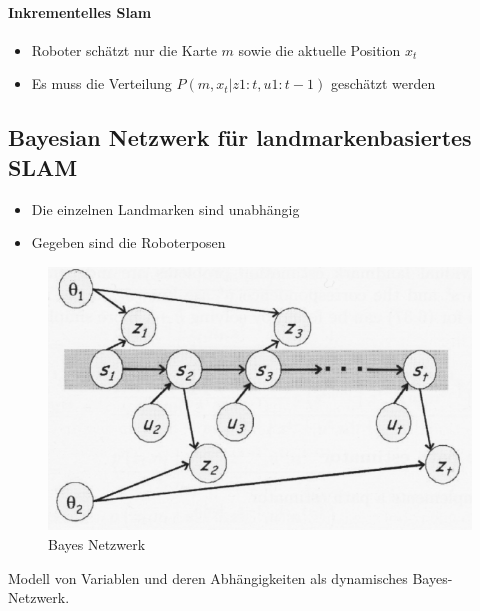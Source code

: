 \paragraph{Inkrementelles Slam}
\begin{itemize}
	\item Roboter schätzt nur die Karte $m$ sowie die aktuelle Position $x_t$
	\item Es muss die Verteilung $P(m, x_t | z1:t, u1:t-1)$ geschätzt werden
\end{itemize}
\subsection{Bayesian Netzwerk für landmarkenbasiertes SLAM}
\begin{itemize}
	\item Die einzelnen Landmarken sind unabhängig
	\item Gegeben sind die Roboterposen
\end{itemize}
\begin{figure}[H]
	\begin{center}
		\includegraphics[scale=0.8]{Resources/PNG/BayesNetzwerk}
		\caption{Bayes Netzwerk}
		\label{fig:PNG/BayesNetzwerk}
	\end{center}
\end{figure}
Modell von Variablen und deren Abhängigkeiten als dynamisches Bayes-Netzwerk.
